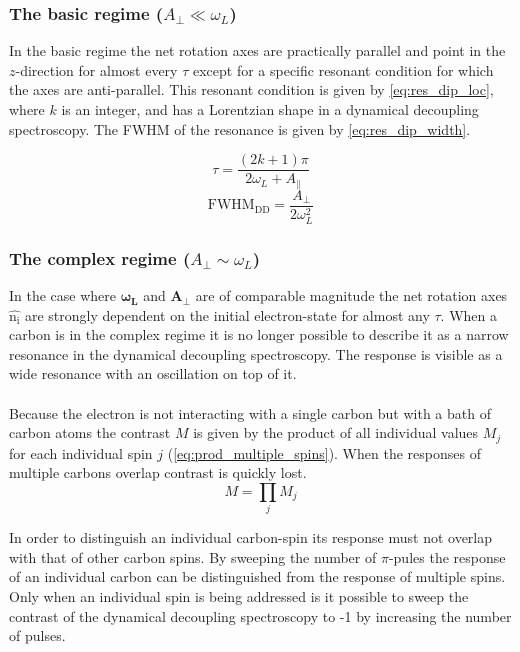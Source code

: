 \subsubsection{The basic regime ($A_\perp \ll \omega_L$)}
In the basic regime the net rotation axes are practically parallel and point in the $z$-direction for almost every $\tau$ except for a specific resonant condition for which the axes are anti-parallel.
This resonant condition is given by \cref{eq:res_dip_loc}, where $k$ is an integer, and has a Lorentzian shape in a dynamical decoupling spectroscopy.
The FWHM of the resonance is given by \cref{eq:res_dip_width}.

 \begin{equation}
\tau = \frac{(2k+1)\pi}{2 \omega_L + A_\parallel}
\label{eq:res_dip_loc}
\end{equation}
 \begin{equation}
\mathrm{FWHM_{DD}} = \frac{A_\perp}{2 \omega_L^2}
\label{eq:res_dip_width}
\end{equation}

\subsubsection{The complex regime ($A_\perp \sim \omega_L$)}

In the case where $\bm{\omega_L}$ and $\bm{A_\perp}$ are of comparable magnitude the net rotation axes $\bm{\hat{\mathrm{n_i}}}$ are strongly dependent on the initial electron-state for almost any $\tau$.
When a carbon is in the complex regime it is no longer possible to describe it as a narrow resonance in the dynamical decoupling spectroscopy.
The response is visible as a wide resonance with an oscillation on top of it.

\paragraph{}
Because the electron is not interacting with a single carbon but with a bath of carbon atoms the contrast $M$ is given by the product of all individual values $M_j$ for each individual spin $j$ (\cref{eq:prod_multiple_spins}).
When the responses of multiple carbons overlap contrast is quickly lost.
\begin{equation}
\label{eq:prod_multiple_spins}
    M = \prod_{j}{M_j}
\end{equation}

In order to distinguish an individual carbon-spin its response must not overlap with that of other carbon spins.
By sweeping the number of $\pi$-pules the response of an individual carbon can be distinguished from the response of multiple spins.
Only when an individual spin is being addressed is it possible to sweep the contrast of the dynamical decoupling spectroscopy to -1 by increasing the number of pulses.

